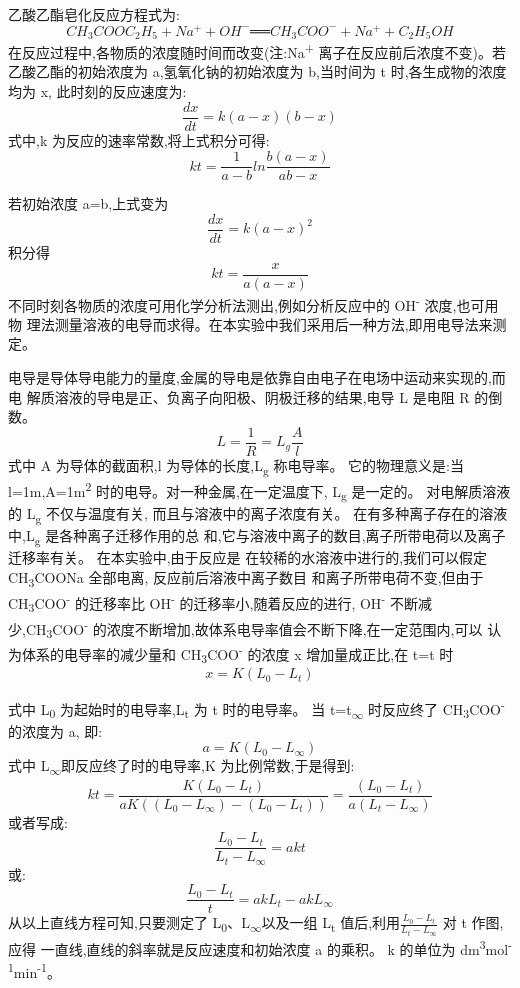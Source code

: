 \documentclass[11pt]{article}
\begin{document}
乙酸乙酯皂化反应方程式为:
\[
CH_3COOC_2H_5+Na^+ + OH^- ══ CH_3COO^- + Na^+ +C_2H_5OH
\]
在反应过程中,各物质的浓度随时间而改变(注:Na\textsuperscript{+}
离子在反应前后浓度不变)。若
乙酸乙酯的初始浓度为 a,氢氧化钠的初始浓度为 b,当时间为 t 时,各生成物的浓度均为 x,
此时刻的反应速度为:
\[
\frac{dx}{dt}=k(a-x)(b-x)
\]
式中,k 为反应的速率常数,将上式积分可得:
\[
kt=\frac{1}{a-b}ln\frac{b(a-x)}{a{b-x}}
\]

若初始浓度 a=b,上式变为
\[
\frac{dx}{dt}=k(a-x)^2
\]
积分得
\[
kt=\frac{x}{a(a-x)}
\]
不同时刻各物质的浓度可用化学分析法测出,例如分析反应中的 OH\textsuperscript{-}
浓度,也可用物
理法测量溶液的电导而求得。在本实验中我们采用后一种方法,即用电导法来测定。

电导是导体导电能力的量度,金属的导电是依靠自由电子在电场中运动来实现的,而电
解质溶液的导电是正、负离子向阳极、阴极迁移的结果,电导 L 是电阻 R 的倒数。
\[
L=\frac{1}{R}=L_{g}\frac{A}{l}
\]
式中 A 为导体的截面积,l 为导体的长度,L\textsubscript{g} 称电导率。
它的物理意义是:当 l=1m,A=1m\textsuperscript{2}
时的电导。对一种金属,在一定温度下, L\textsubscript{g} 是一定的。
对电解质溶液的 L\textsubscript{g} 不仅与温度有关,
而且与溶液中的离子浓度有关。
在有多种离子存在的溶液中,L\textsubscript{g} 是各种离子迁移作用的总
和,它与溶液中离子的数目,离子所带电荷以及离子迁移率有关。
在本实验中,由于反应是
在较稀的水溶液中进行的,我们可以假定 CH\textsubscript{3}COONa 全部电离,
反应前后溶液中离子数目
和离子所带电荷不变,但由于 CH\textsubscript{3}COO\textsuperscript{-}
的迁移率比 OH\textsuperscript{-}
的迁移率小,随着反应的进行, OH\textsuperscript{-}
不断减少,CH\textsubscript{3}COO\textsuperscript{-}
的浓度不断增加,故体系电导率值会不断下降,在一定范围内,可以
认为体系的电导率的减少量和 CH\textsubscript{3}COO\textsuperscript{-}
的浓度 x 增加量成正比,在 t=t 时
\[
x=K(L_0 -L_t)
\]

式中 L\textsubscript{0} 为起始时的电导率,L\textsubscript{t} 为 t 时的电导率。
当 t=t\textsubscript{\(\infty\)} 时反应终了 CH\textsubscript{3}COO\textsuperscript{-}
的浓度为 a,
即:
\[
a=K(L_{0}-L_{\infty})
\]
式中 L\textsubscript{\(\infty\)}即反应终了时的电导率,K 为比例常数,于是得到:
\[
kt=\frac{K(L_{0}-L_{t})}{aK((L_{0}-L_{\infty})-(L_{0}-L_{t}))}=\frac{(L_{0}-L_{t})}{a(L_{t}-L_{\infty})}
\]
或者写成:
\[
\frac{L_{0}-L_{t}}{L_{t}-L_{\infty}}=akt
\]
或:
\[
\frac{L_{0}-L_{t}}{t}=akL_{t}-akL_{\infty}
\]
从以上直线方程可知,只要测定了 L\textsubscript{0}、L\textsubscript{\(\infty\)}以及一组 L\textsubscript{t} 
值后,利用\(\frac{L_{0}-L_{t}}{L_{t}-L_{\infty}}\)
 对 t 作图,应得
一直线,直线的斜率就是反应速度和初始浓度 a 的乘积。
k 的单位为 dm\textsuperscript{3}mol\textsuperscript{-1}min\textsuperscript{-1}。
\end{document}
